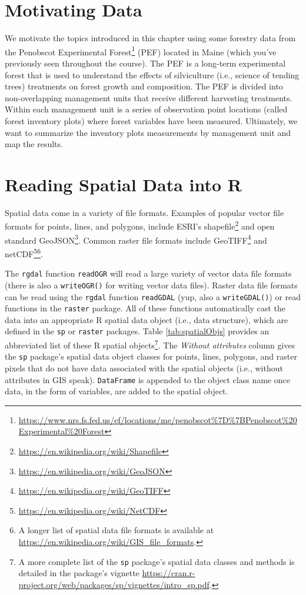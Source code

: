 \documentclass[]{krantz}
\renewcommand{\href}[2]{#2\footnote{\url{#1}}}
\begin{document}
\hypertarget{motivating-data}{%
\section{Motivating Data}\label{motivating-data}}

We motivate the topics introduced in this chapter using some forestry data from the \href{https://www.nrs.fs.fed.us/ef/locations/me/penobscot\%7D\%7BPenobscot\%20Experimental\%20Forest}{Penobscot Experimental Forest} (PEF) located in Maine (which you've previously seen throughout the course). The PEF is a long-term experimental forest that is used to understand the effects of silviculture (i.e., science of tending trees) treatments on forest growth and composition. The PEF is divided into non-overlapping management units that receive different harvesting treatments. Within each management unit is a series of observation point locations (called forest inventory plots) where forest variables have been measured. Ultimately, we want to summarize the inventory plots measurements by management unit and map the results.

\hypertarget{reading-spatial-data-into-r}{%
\section{Reading Spatial Data into R}\label{reading-spatial-data-into-r}}

Spatial data come in a variety of file formats. Examples of popular vector file formats for points, lines, and polygons, include ESRI's \href{https://en.wikipedia.org/wiki/Shapefile}{shapefile} and open standard \href{https://en.wikipedia.org/wiki/GeoJSON}{GeoJSON}. Common raster file formats include \href{https://en.wikipedia.org/wiki/GeoTIFF}{GeoTIFF} and \href{https://en.wikipedia.org/wiki/NetCDF}{netCDF}\footnote{A longer list of spatial data file formats is available at \url{https://en.wikipedia.org/wiki/GIS_file_formats}.}.

The \texttt{rgdal} function \texttt{readOGR} will read a large variety of vector data file formats (there is also a \texttt{writeOGR()} for writing vector data files). Raster data file formats can be read using the \texttt{rgdal} function \texttt{readGDAL} (yup, also a \texttt{writeGDAL()}) or read functions in the \texttt{raster} package. All of these functions automatically cast the data into an appropriate R spatial data object (i.e., data structure), which are defined in the \texttt{sp} or \texttt{raster} packages. Table \ref{tab:spatialObjs} provides an abbreviated list of these R spatial objects\footnote{A more complete list of the \texttt{sp} package's spatial data classes and methods is detailed in the package's vignette \url{https://cran.r-project.org/web/packages/sp/vignettes/intro_sp.pdf}.}. The \emph{Without attributes }column gives the \texttt{sp} package's spatial data object classes for points, lines, polygons, and raster pixels that do not have data associated with the spatial objects (i.e., without attributes in GIS speak). \texttt{DataFrame} is appended to the object class name once data, in the form of variables, are added to the spatial object.
\end{document}
